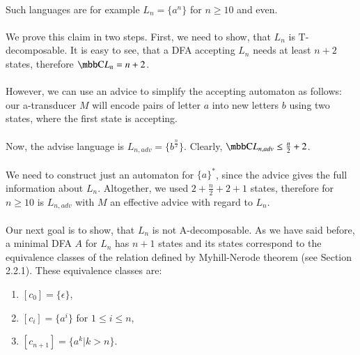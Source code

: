 \paragraph{}
\dokaz Such languages are for example $L_{n} = \{ a^n \}$ for $n \geq 10$ and even.

\paragraph{}
We prove this claim in two steps. First, we need to show, that $L_{n}$ is T-decomposable. It is easy to see, that  a DFA accepting $L_{n}$ needs at least $n +2$ states, therefore $\C{L_n} = n + 2$.

\paragraph{}
However, we can use an advice to simplify the accepting automaton as follows: our a-transducer $M$ will encode pairs of letter $a$ into new letters $b$ using two states, where the first state is accepting.

\paragraph{}
Now, the advise language is $L_{n,adv} = \{ b^{\frac{n}{2}} \}$. Clearly, $\C{L_{n,adv}} \leq \frac{n}{2} + 2$.

\paragraph{}
We need to construct just an automaton for $\{a\}^*$, since the advice gives the full information about $L_n$. Altogether, we used $2 + \frac{n}{2}+2+1$ states, therefore for $n \geq 10$ is $L_{n,adv}$ with $M$ an effective advice with regard to $L_n$.

\paragraph{}
Our next goal is to show, that $L_n$ is not A-decomposable. As we have said before, a minimal DFA $A$ for $L_n$ has $n+1$ states and its states correspond to the equivalence classes of the relation defined by Myhill-Nerode theorem (see Section 2.2.1). These equivalence classes are:
\begin{enumerate}
\item $[c_0] = \{ \epsilon \}$,
\item $[c_{i}] = \{ a^i \}$ for $1 \leq i \leq n$,
\item $[c_{n+1}] = \{ a^k | k > n \}$.
\end{enumerate}

